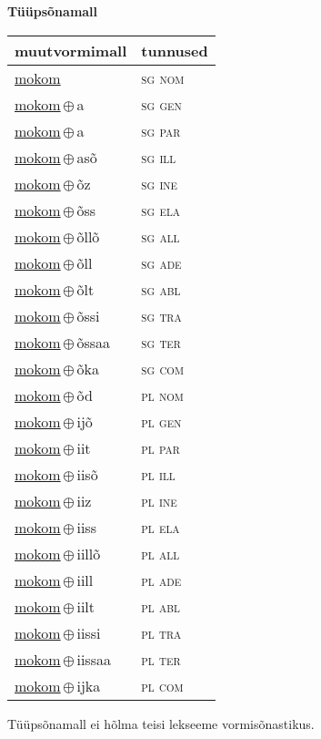 

\vspace{3.5em}
\noindent \begin{minipage}{\textwidth}
\noindent \textbf{Tüüpsõnamall \,}\\

\begin{sideways}
\begin{tabular}{l l}
muutvormimall & tunnused \\
\hline
\underline{mokom} & \textsc{ sg nom } \\
\underline{mokom}\,$\oplus$\,a & \textsc{ sg gen } \\
\underline{mokom}\,$\oplus$\,a & \textsc{ sg par } \\
\underline{mokom}\,$\oplus$\,asõ & \textsc{ sg ill } \\
\underline{mokom}\,$\oplus$\,õz & \textsc{ sg ine } \\
\underline{mokom}\,$\oplus$\,õss & \textsc{ sg ela } \\
\underline{mokom}\,$\oplus$\,õllõ & \textsc{ sg all } \\
\underline{mokom}\,$\oplus$\,õll & \textsc{ sg ade } \\
\underline{mokom}\,$\oplus$\,õlt & \textsc{ sg abl } \\
\underline{mokom}\,$\oplus$\,õssi & \textsc{ sg tra } \\
\underline{mokom}\,$\oplus$\,õssaa & \textsc{ sg ter } \\
\underline{mokom}\,$\oplus$\,õka & \textsc{ sg com } \\
\underline{mokom}\,$\oplus$\,õd & \textsc{ pl nom } \\
\underline{mokom}\,$\oplus$\,ijõ & \textsc{ pl gen } \\
\underline{mokom}\,$\oplus$\,iit & \textsc{ pl par } \\
\underline{mokom}\,$\oplus$\,iisõ & \textsc{ pl ill } \\
\underline{mokom}\,$\oplus$\,iiz & \textsc{ pl ine } \\
\underline{mokom}\,$\oplus$\,iiss & \textsc{ pl ela } \\
\underline{mokom}\,$\oplus$\,iillõ & \textsc{ pl all } \\
\underline{mokom}\,$\oplus$\,iill & \textsc{ pl ade } \\
\underline{mokom}\,$\oplus$\,iilt & \textsc{ pl abl } \\
\underline{mokom}\,$\oplus$\,iissi & \textsc{ pl tra } \\
\underline{mokom}\,$\oplus$\,iissaa & \textsc{ pl ter } \\
\underline{mokom}\,$\oplus$\,ijka & \textsc{ pl com } \\
\end{tabular}
\end{sideways}
\label{tab:tüüpsõnamall-mokom}

\end{minipage}

 
\vspace{1em}
\noindent Tüüpsõnamall  ei hõlma teisi lekseeme vormi\-sõnastikus.
